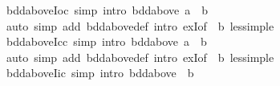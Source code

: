 \begin{isabellebody}
%
\isadelimproof
\isanewline
%
\endisadelimproof
\isanewline
{}\isamarkupfalse%
\ bdd{\isacharunderscore}{\kern0pt}above{\isacharunderscore}{\kern0pt}Ioc\ {\isacharbrackleft}{\kern0pt}simp{\isacharcomma}{\kern0pt}\ intro{\isacharbrackright}{\kern0pt}{\isacharcolon}{\kern0pt}\ {\isachardoublequoteopen}bdd{\isacharunderscore}{\kern0pt}above\ {\isacharbraceleft}{\kern0pt}a\ {\isacharless}{\kern0pt}{\isachardot}{\kern0pt}{\isachardot}{\kern0pt}\ b{\isacharbraceright}{\kern0pt}{\isachardoublequoteclose}\isanewline
%
\isadelimproof
\ \ %
\endisadelimproof
%
\isatagproof
{}\isamarkupfalse%
\ {\isacharparenleft}{\kern0pt}auto\ simp\ add{\isacharcolon}{\kern0pt}\ bdd{\isacharunderscore}{\kern0pt}above{\isacharunderscore}{\kern0pt}def\ intro{\isacharcolon}{\kern0pt}\ exI{\isacharbrackleft}{\kern0pt}of\ {\isacharunderscore}{\kern0pt}\ b{\isacharbrackright}{\kern0pt}\ less{\isacharunderscore}{\kern0pt}imp{\isacharunderscore}{\kern0pt}le{\isacharparenright}{\kern0pt}%
\endisatagproof
{\isafoldproof}%
%
\isadelimproof
\isanewline
%
\endisadelimproof
\isanewline
{}\isamarkupfalse%
\ bdd{\isacharunderscore}{\kern0pt}above{\isacharunderscore}{\kern0pt}Icc\ {\isacharbrackleft}{\kern0pt}simp{\isacharcomma}{\kern0pt}\ intro{\isacharbrackright}{\kern0pt}{\isacharcolon}{\kern0pt}\ {\isachardoublequoteopen}bdd{\isacharunderscore}{\kern0pt}above\ {\isacharbraceleft}{\kern0pt}a\ {\isachardot}{\kern0pt}{\isachardot}{\kern0pt}\ b{\isacharbraceright}{\kern0pt}{\isachardoublequoteclose}\isanewline
%
\isadelimproof
\ \ %
\endisadelimproof
%
\isatagproof
{}\isamarkupfalse%
\ {\isacharparenleft}{\kern0pt}auto\ simp\ add{\isacharcolon}{\kern0pt}\ bdd{\isacharunderscore}{\kern0pt}above{\isacharunderscore}{\kern0pt}def\ intro{\isacharcolon}{\kern0pt}\ exI{\isacharbrackleft}{\kern0pt}of\ {\isacharunderscore}{\kern0pt}\ b{\isacharbrackright}{\kern0pt}\ less{\isacharunderscore}{\kern0pt}imp{\isacharunderscore}{\kern0pt}le{\isacharparenright}{\kern0pt}%
\endisatagproof
{\isafoldproof}%
%
\isadelimproof
\isanewline
%
\endisadelimproof
\isanewline
{}\isamarkupfalse%
\ bdd{\isacharunderscore}{\kern0pt}above{\isacharunderscore}{\kern0pt}Iic\ {\isacharbrackleft}{\kern0pt}simp{\isacharcomma}{\kern0pt}\ intro{\isacharbrackright}{\kern0pt}{\isacharcolon}{\kern0pt}\ {\isachardoublequoteopen}bdd{\isacharunderscore}{\kern0pt}above\ {\isacharbraceleft}{\kern0pt}{\isachardot}{\kern0pt}{\isachardot}{\kern0pt}\ b{\isacharbraceright}{\kern0pt}{\isachardoublequoteclose}\isanewline
%
\isadelimproof
\ \ %
\endisadelimproof
%
\isatagproof

\end{isabellebody}
